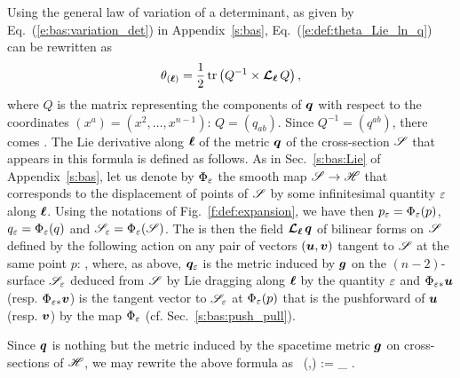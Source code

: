 Using the general law of variation of a determinant, as given by Eq.~(\ref{e:bas:variation_det})
in Appendix~\ref{s:bas}, Eq.~(\ref{e:def:theta_Lie_ln_q}) can be rewritten as
\[
    \theta_{(\bm{\ell})} = \frac{1}{2} \, \mathrm{tr} \left(Q^{-1} \times \bm{\mathcal{L}}_{\bm{\ell}}\, Q \right) ,
\]
where $Q$ is the matrix representing the components of $\bm{q}$ with respect to the
coordinates $(x^a) = (x^2,\ldots, x^{n-1})$: $Q = (q_{ab})$. Since
$Q^{-1} = (q^{ab})$, there comes
\be \label{e:def:theta_q_ab}
     .
\ee
The Lie derivative along $\bm{\ell}$ of the metric $\bm{q}$ of the cross-section
$\mathscr{S}$ that appears in this formula is defined as follows. As in Sec.~\ref{s:bas:Lie}
of Appendix~\ref{s:bas}, let us denote by $\Phi_\varepsilon$ the smooth map
$\mathscr{S} \to \mathscr{H}$ that corresponds to the displacement of points of $\mathscr{S}$ by
some infinitesimal quantity $\varepsilon$ along $\bm{\ell}$. Using the notations
of Fig.~\ref{f:def:expansion}, we have then $p_\varepsilon = \Phi_\varepsilon(p)$,
$q_\varepsilon = \Phi_\varepsilon(q)$ and $\mathscr{S}_\varepsilon = \Phi_\varepsilon(\mathscr{S})$. The  is then the field $\bm{\mathcal{L}}_{\bm{\ell}}\, \bm{q}$
of bilinear forms on $\mathscr{S}$ defined by the following action on any pair of vectors $(\bm{u},\bm{v})$
tangent to $\mathscr{S}$ at the same point $p$:
\be \label{e:def:def_Lie_ell_q}
   ,
\ee
where, as above, $\bm{q}_\varepsilon$ is the metric induced by $\bm{g}$ on the $(n-2)$-surface
$\mathscr{S}_\varepsilon$ deduced from $\mathscr{S}$ by Lie dragging along $\bm{\ell}$ by the quantity $\varepsilon$
and
$\Phi_{\varepsilon*} \bm{u}$ (resp. $\Phi_{\varepsilon*} \bm{v}$) is the tangent vector to $\mathscr{S}_\varepsilon$
at $\Phi_\varepsilon(p)$ that is the pushforward of $\bm{u}$ (resp. $\bm{v}$) by the map $\Phi_\varepsilon$
(cf. Sec.~\ref{s:bas:push_pull}).

\begin{remark}
Since $\bm{q}$ is nothing but the metric induced by the spacetime metric $\bm{g}$
on cross-sections of $\mathscr{H}$, we may rewrite the above formula as
\be
     \Lie{\el} \, (,) := \lim_{\veps{}} 
     .
\ee
\end{remark}

